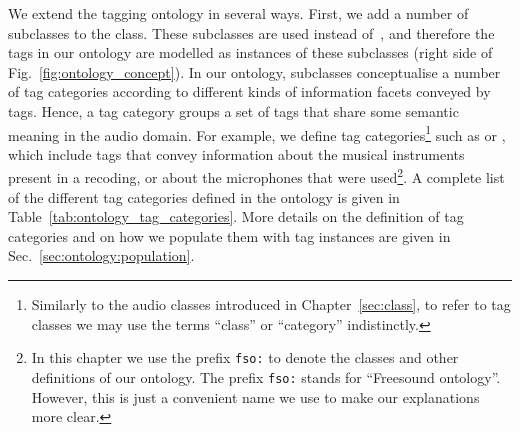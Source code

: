 We extend the tagging ontology in several ways. First, we add a number of subclasses to the  class.
These subclasses are used instead of~, and therefore the tags in our ontology are modelled as instances of these subclasses (right side of Fig.~\ref{fig:ontology_concept}).
In our ontology,  subclasses conceptualise a number of tag categories according to different kinds of information facets conveyed by tags. 
Hence, a tag category groups a set of tags that share some semantic meaning in the audio domain.
For example, we define tag categories\footnote{Similarly to the audio classes introduced in Chapter~\ref{sec:class}, to refer to tag classes we may use the terms ``class'' or ``category'' indistinctly.} such as  or , which include tags that convey information about the musical instruments present in a recoding, or about the microphones that were used\footnote{In this chapter we use the prefix \texttt{fso:} to denote the classes and other definitions of our ontology. The prefix \texttt{fso:} stands for ``Freesound ontology''. However, this is just a convenient name we use to make our explanations more clear.}.
A complete list of the different tag categories defined in the ontology is given in Table~\ref{tab:ontology_tag_categories}. 
More details on the definition of tag categories and on how we populate them with tag instances are given in Sec.~\ref{sec:ontology:population}.

